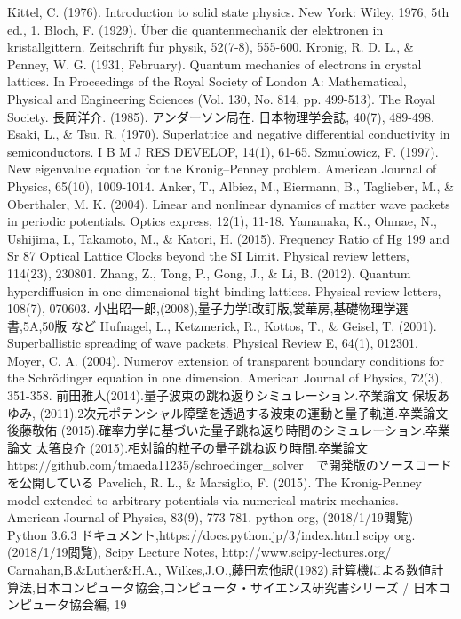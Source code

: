 \documentclass[a4paper, lualatex]{bxjsarticle}
\begin{document}
\begin{thebibliography}{30}
Kittel, C. (1976). Introduction to solid state physics. New York: Wiley, 1976, 5th ed., 1.
Bloch, F. (1929). Über die quantenmechanik der elektronen in kristallgittern. Zeitschrift für physik, 52(7-8), 555-600.
Kronig, R. D. L., \& Penney, W. G. (1931, February). Quantum mechanics of electrons in crystal lattices. In Proceedings of the Royal Society of London A: Mathematical, Physical and Engineering Sciences (Vol. 130, No. 814, pp. 499-513). The Royal Society.
長岡洋介. (1985). アンダーソン局在. 日本物理学会誌, 40(7), 489-498.
Esaki, L., \& Tsu, R. (1970). Superlattice and negative differential conductivity in semiconductors. I B M J RES DEVELOP, 14(1), 61-65.
Szmulowicz, F. (1997). New eigenvalue equation for the Kronig–Penney problem. American Journal of Physics, 65(10), 1009-1014.
Anker, T., Albiez, M., Eiermann, B., Taglieber, M., \& Oberthaler, M. K. (2004). Linear and nonlinear dynamics of matter wave packets in periodic potentials. Optics express, 12(1), 11-18.
Yamanaka, K., Ohmae, N., Ushijima, I., Takamoto, M., \& Katori, H. (2015). Frequency Ratio of Hg 199 and Sr 87 Optical Lattice Clocks beyond the SI Limit. Physical review letters, 114(23), 230801.
Zhang, Z., Tong, P., Gong, J., \& Li, B. (2012). Quantum hyperdiffusion in one-dimensional tight-binding lattices. Physical review letters, 108(7), 070603.
小出昭一郎,(2008),量子力学I改訂版,裳華房,基礎物理学選書,5A,50版 など
Hufnagel, L., Ketzmerick, R., Kottos, T., \& Geisel, T. (2001). Superballistic spreading of wave packets. Physical Review E, 64(1), 012301.
Moyer, C. A. (2004). Numerov extension of transparent boundary conditions for the Schrödinger equation in one dimension. American Journal of Physics, 72(3), 351-358.
前田雅人(2014).量子波束の跳ね返りシミュレーション.卒業論文
保坂あゆみ,  (2011).2次元ポテンシャル障壁を透過する波束の運動と量子軌道.卒業論文
後藤敬佑 (2015).確率力学に基づいた量子跳ね返り時間のシミュレーション.卒業論文
太箸良介 (2015).相対論的粒子の量子跳ね返り時間.卒業論文
 https://github.com/tmaeda11235/schroedinger\_solver　で開発版のソースコードを公開している
Pavelich, R. L., \& Marsiglio, F. (2015). The Kronig-Penney model extended to arbitrary potentials via numerical matrix mechanics. American Journal of Physics, 83(9), 773-781.
python org, (2018/1/19閲覧) Python 3.6.3 ドキュメント,https://docs.python.jp/3/index.html
scipy org. (2018/1/19閲覧), Scipy Lecture Notes, http://www.scipy-lectures.org/
Carnahan,B.\&Luther\&H.A., Wilkes,J.O.,藤田宏他訳(1982).計算機による数値計算法,日本コンピュータ協会,コンピュータ・サイエンス研究書シリーズ / 日本コンピュータ協会編, 19
\end{thebibliography}
\end{document}
